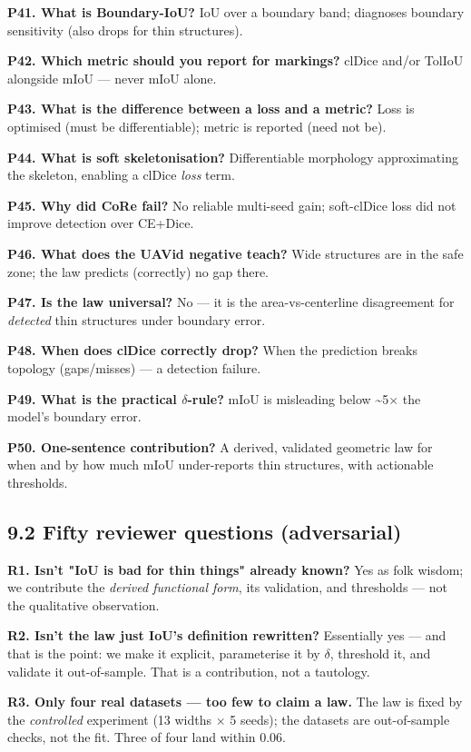 \documentclass[11pt]{article}
\begin{document}
\textbf{P41. What is Boundary-IoU?} IoU over a boundary band; diagnoses boundary sensitivity (also drops for thin structures).

\textbf{P42. Which metric should you report for markings?} clDice and/or TolIoU alongside mIoU --- never mIoU alone.

\textbf{P43. What is the difference between a loss and a metric?} Loss is optimised (must be differentiable); metric is reported (need not be).

\textbf{P44. What is soft skeletonisation?} Differentiable morphology approximating the skeleton, enabling a clDice \textit{loss} term.

\textbf{P45. Why did CoRe fail?} No reliable multi-seed gain; soft-clDice loss did not improve detection over CE+Dice.

\textbf{P46. What does the UAVid negative teach?} Wide structures are in the safe zone; the law predicts (correctly) no gap there.

\textbf{P47. Is the law universal?} No --- it is the area-vs-centerline disagreement for \textit{detected} thin structures under boundary error.

\textbf{P48. When does clDice correctly drop?} When the prediction breaks topology (gaps/misses) --- a detection failure.

\textbf{P49. What is the practical $\delta$-rule?} mIoU is misleading below \textasciitilde{}5$\times$ the model's boundary error.

\textbf{P50. One-sentence contribution?} A derived, validated geometric law for when and by how much mIoU under-reports thin structures, with actionable thresholds.

\subsection*{9.2 Fifty reviewer questions (adversarial)}

\textbf{R1. Isn't "IoU is bad for thin things" already known?} Yes as folk wisdom; we contribute the \textit{derived functional form}, its validation, and thresholds --- not the qualitative observation.

\textbf{R2. Isn't the law just IoU's definition rewritten?} Essentially yes --- and that is the point: we make it explicit, parameterise it by $\delta$, threshold it, and validate it out-of-sample. That is a contribution, not a tautology.

\textbf{R3. Only four real datasets --- too few to claim a law.} The law is fixed by the \textit{controlled} experiment (13 widths $\times$ 5 seeds); the datasets are out-of-sample checks, not the fit. Three of four land within 0.06.
\end{document}
